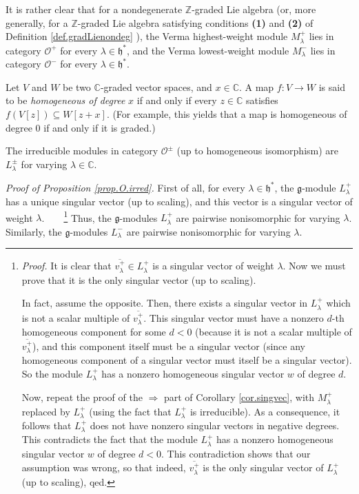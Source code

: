 \documentclass[etingof-lie.tex]{subfiles}
\begin{document}
It is rather clear that for a nondegenerate $\mathbb{Z}$-graded Lie algebra
(or, more generally, for a $\mathbb{Z}$-graded Lie algebra satisfying
conditions \textbf{(1)} and \textbf{(2)} of Definition \ref{def.gradLienondeg}%
), the Verma highest-weight module $M_{\lambda}^{+}$ lies in category
$\mathcal{O}^{+}$ for every $\lambda\in\mathfrak{h}^{\ast}$, and the Verma
lowest-weight module $M_{\lambda}^{-}$ lies in category $\mathcal{O}^{-}$ for
every $\lambda\in\mathfrak{h}^{\ast}$.

\begin{definition}
Let $V$ and $W$ be two $\mathbb{C}$-graded vector spaces, and $x\in\mathbb{C}%
$. A map $f:V\rightarrow W$ is said to be \textit{homogeneous of degree }$x$
if and only if every $z\in\mathbb{C}$ satisfies $f\left(  V\left[  z\right]
\right)  \subseteq W\left[  z+x\right]  $. (For example, this yields that a
map is homogeneous of degree $0$ if and only if it is graded.)
\end{definition}

\begin{proposition}
\label{prop.O.irred}The irreducible modules in category $\mathcal{O}^{\pm}$
(up to homogeneous isomorphism) are $L_{\lambda}^{\pm}$ for varying
$\lambda\in\mathbb{C}$.
\end{proposition}

\textit{Proof of Proposition \ref{prop.O.irred}.} First of all, for every
$\lambda\in\mathfrak{h}^{\ast}$, the $\mathfrak{g}$-module $L_{\lambda}^{+}$
has a unique singular vector (up to scaling), and this vector is a singular
vector of weight $\lambda$.\ \ \ \ \footnote{\textit{Proof.} It is clear that
$\overline{v_{\lambda}^{+}}\in L_{\lambda}^{+}$ is a singular vector of weight
$\lambda$. Now we must prove that it is the only singular vector (up to
scaling).
\par
In fact, assume the opposite. Then, there exists a singular vector in
$L_{\lambda}^{+}$ which is not a scalar multiple of $\overline{v_{\lambda}%
^{+}}$. This singular vector must have a nonzero $d$-th homogeneous component
for some $d<0$ (because it is not a scalar multiple of $\overline{v_{\lambda
}^{+}}$), and this component itself must be a singular vector (since any
homogeneous component of a singular vector must itself be a singular vector).
So the module $L_{\lambda}^{+}$ has a nonzero homogeneous singular vector $w$
of degree $d$.
\par
Now, repeat the proof of the $\Longrightarrow$ part of Corollary
\ref{cor.singvec}, with $M_{\lambda}^{+}$ replaced by $L_{\lambda}^{+}$ (using
the fact that $L_{\lambda}^{+}$ is irreducible). As a consequence, it follows
that $L_{\lambda}^{+}$ does not have nonzero singular vectors in negative
degrees. This contradicts the fact that the module $L_{\lambda}^{+}$ has a
nonzero homogeneous singular vector $w$ of degree $d<0$. This contradiction
shows that our assumption was wrong, so that indeed, $\overline{v_{\lambda
}^{+}}$ is the only singular vector of $L_{\lambda}^{+}$ (up to scaling),
qed.} Thus, the $\mathfrak{g}$-modules $L_{\lambda}^{+}$ are pairwise
nonisomorphic for varying $\lambda$. Similarly, the $\mathfrak{g}$-modules
$L_{\lambda}^{-}$ are pairwise nonisomorphic for varying $\lambda$.
\end{document}

